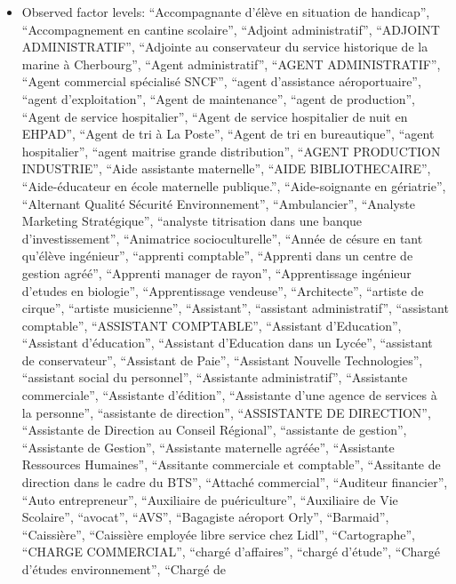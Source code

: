 \documentclass[
  letterpaper,
  DIV=11,
  numbers=noendperiod]{scrartcl}
\providecommand{\tightlist}{%
  \setlength{\itemsep}{0pt}\setlength{\parskip}{0pt}}
\begin{document}
\begin{itemize}
\tightlist
\item
  Observed factor levels: ``Accompagnante d'élève en situation de
  handicap'', ``Accompagnement en cantine scolaire'', ``Adjoint
  administratif'', ``ADJOINT ADMINISTRATIF'', ``Adjointe au conservateur
  du service historique de la marine à Cherbourg'', ``Agent
  administratif'', ``AGENT ADMINISTRATIF'', ``Agent commercial
  spécialisé SNCF'', ``agent d'assistance aéroportuaire'', ``agent
  d'exploitation'', ``Agent de maintenance'', ``agent de production'',
  ``Agent de service hospitalier'', ``Agent de service hospitalier de
  nuit en EHPAD'', ``Agent de tri à La Poste'', ``Agent de tri en
  bureautique'', ``agent hospitalier'', ``agent maitrise grande
  distribution'', ``AGENT PRODUCTION INDUSTRIE'', ``Aide assistante
  maternelle'', ``AIDE BIBLIOTHECAIRE'', ``Aide-éducateur en école
  maternelle publique.'', ``Aide-soignante en gériatrie'', ``Alternant
  Qualité Sécurité Environnement'', ``Ambulancier'', ``Analyste
  Marketing Stratégique'', ``analyste titrisation dans une banque
  d'investissement'', ``Animatrice socioculturelle'', ``Année de césure
  en tant qu'élève ingénieur'', ``apprenti comptable'', ``Apprenti dans
  un centre de gestion agréé'', ``Apprenti manager de rayon'',
  ``Apprentissage ingénieur d'etudes en biologie'', ``Apprentissage
  vendeuse'', ``Architecte'', ``artiste de cirque'', ``artiste
  musicienne'', ``Assistant'', ``assistant administratif'', ``assistant
  comptable'', ``ASSISTANT COMPTABLE'', ``Assistant d'Education'',
  ``Assistant d'éducation'', ``Assistant d'Education dans un Lycée'',
  ``assistant de conservateur'', ``Assistant de Paie'', ``Assistant
  Nouvelle Technologies'', ``assistant social du personnel'',
  ``Assistante administratif'', ``Assistante commerciale'', ``Assistante
  d'édition'', ``Assistante d'une agence de services à la personne'',
  ``assistante de direction'', ``ASSISTANTE DE DIRECTION'', ``Assistante
  de Direction au Conseil Régional'', ``assistante de gestion'',
  ``Assistante de Gestion'', ``Assistante maternelle agréée'',
  ``Assistante Ressources Humaines'', ``Assitante commerciale et
  comptable'', ``Assitante de direction dans le cadre du BTS'',
  ``Attaché commercial'', ``Auditeur financier'', ``Auto entrepreneur'',
  ``Auxiliaire de puériculture'', ``Auxiliaire de Vie Scolaire'',
  ``avocat'', ``AVS'', ``Bagagiste aéroport Orly'', ``Barmaid'',
  ``Caissière'', ``Caissière employée libre service chez Lidl'',
  ``Cartographe'', ``CHARGE COMMERCIAL'', ``chargé d'affaires'',
  ``chargé d'étude'', ``Chargé d'études environnement'', ``Chargé de

\end{itemize}
\end{document}
